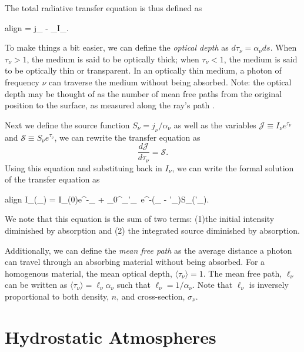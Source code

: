 	The total radiative transfer equation is thus defined as 
	\begin{empheq}[box=\widefbox]{align}
		\label{eq:transfer}
		 = j_{\nu} - \alpha_{\nu}I_{\nu}.
	\end{empheq}
	To make things a bit easier, we can define the \textit{optical depth} as $d\tau_{\nu}=\alpha_{\nu}ds$. When $\tau_{\nu}>1$, the medium is said to be optically thick; when $\tau_{\nu}<1$, the medium is said to be optically thin or transparent. In an optically thin medium, a photon of frequency $\nu$ can traverse the medium without being absorbed. Note: the optical depth may be thought of as the number of mean free paths from the original position to the surface, as measured along the ray's path \citep{carroll_introduction_2007}.
	
	Next we define the source function $S_{\nu}=j_{\nu}/\alpha_{\nu}$ as well as the variables $\mathcal{J}\equiv I_{\nu}e^{\tau_{\nu}}$ and $\mathcal{S}\equiv S_{\nu}e^{\tau_{\nu}}$, we can rewrite the transfer equation as 
	\begin{equation}
		\frac{d\mathcal{J}}{d\tau_{\nu}}=\mathcal{S}.
	\end{equation}
	Using this equation and substituing back in $I_\nu$, we can write the formal solution of the transfer equation as
	\begin{empheq}[box=\widefbox]{align}
		\label{eq:transfer_soltn}
		I_{\nu}(\tau_{\nu}) = I_{\nu}(0)e^{-\tau_{\nu}} + \int_0^{\tau_{\nu}}\tau'_{\nu}~e^{-(\tau_{\nu} - \tau'_{\nu})}S_{\nu}(\tau'_{\nu}).
	\end{empheq}
	We note that this equation is the sum of two terms: (1)the initial intensity diminished by absorption and (2) the integrated source diminished by absorption.
	
	Additionally, we can define the \textit{mean free path} as the average distance a photon can travel through an absorbing material without being absorbed. For a homogenous material, the mean optical depth, $\langle\tau_{\nu}\rangle=1$. The mean free path, $\ell_{\nu}$ can be written as $\langle\tau_{\nu}\rangle=\ell_{\nu}\alpha_{\nu}$ such that $\ell_{\nu}=1/\alpha_{\nu}$. Note that $\ell_{\nu}$ is inversely proportional to both density, $n$, and cross-section, $\sigma_{\nu}$.

\section{Hydrostatic Atmospheres}

